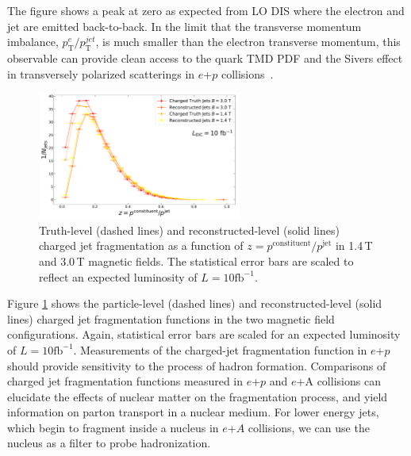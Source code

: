 The figure shows a peak at zero as expected from LO DIS where the electron and jet are emitted back-to-back. In the limit that the transverse momentum imbalance, $p_\mathrm{T}^e / p_\mathrm{T}^{jet}$, is much smaller than the electron transverse momentum, this observable can provide clean access to the quark TMD PDF and the Sivers effect in transversely polarized scatterings in $e$+$p$ collisions~\cite{Liu2019}.

\begin{figure}[htbp]
    \centering
    \includegraphics[height=0.4\textwidth,width=0.6\textwidth]{EIC_Jets/charged_jet_fragmentation.pdf}
    \caption{Truth-level (dashed lines) and reconstructed-level (solid lines) charged jet fragmentation as a function of $z = p^\mathrm{constituent}/p^\mathrm{jet}$ in 1.4\,T and 3.0\,T magnetic fields. The statistical error bars are scaled to reflect an expected luminosity of $L = 10\mathrm{fb}^{-1}$.}
    \label{fig:jet_frag}
\end{figure}

Figure \ref{fig:jet_frag} shows the particle-level (dashed lines) and reconstructed-level (solid lines) charged jet fragmentation functions in the two magnetic field configurations. Again, statistical error bars are scaled for an expected luminosity of $L = 10\mathrm{fb}^{-1}$. Measurements of the charged-jet fragmentation function in $e$+$p$ 
should provide sensitivity to the process of hadron formation. 
Comparisons of charged jet fragmentation functions measured in $e$+$p$ and $e$+A collisions can elucidate the effects of nuclear matter on the fragmentation process, and yield information on parton transport in a nuclear medium. For lower energy jets, which begin to fragment inside a nucleus in $e$+$A$ collisions, we can use the nucleus as a filter to probe hadronization. 


